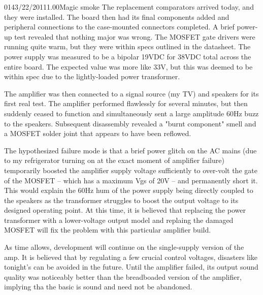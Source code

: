 \documentclass[12pt,letterpaper,onecolumn]{article}
\begin{document}
\begin{nbentry}{014}{3/22/2011}{1.00}{Magic smoke}
The replacement comparators arrived today, and they were installed.  The board then had its final components added and peripheral connections to the case-mounted connectors completed.  A brief power-up test revealed that nothing major was wrong.  The MOSFET gate drivers were running quite warm, but they were within specs outlined in the datasheet.  The power supply was measured to be a bipolar 19VDC for 38VDC total across the entire board.  The expected value was more like 33V, but this was deemed to be within spec due to the lightly-loaded power transformer.

The amplifier was then connected to a signal source (my TV) and speakers for its first real test.  The amplifier performed flawlessly for several minutes, but then suddenly ceased to function and simultaneously sent a large amplitude 60Hz buzz to the speakers.  Subsequent disassembly revealed a "burnt component" smell and a MOSFET solder joint that appears to have been reflowed.

The hypothesized failure mode is that a brief power glitch on the AC mains (due to my refrigerator turning on at the exact moment of amplifier failure) temporarily boosted the amplifier supply voltage sufficiently to over-volt the gate of the MOSFET -- which has a maximum Vgs of 20V -- and permanently short it.  This would explain the 60Hz hum of the power supply being directly coupled to the speakers as the transformer struggles to boost the output voltage to its designed operating point.  At this time, it is believed that replacing the power transformer with a lower-voltage output model and replaing the damaged MOSFET will fix the problem with this particular amplifier build.

As time allows, development will continue on the single-supply version of the amp.  It is believed that by regulating a few crucial control voltages, disasters like tonight's can be avoided in the future.  Until the amplifier failed, its output sound quality was noticeably better than the breadboaded version of the amplifier, implying tha the basic is sound and need not be abandoned.
\end{nbentry}
\end{document}
